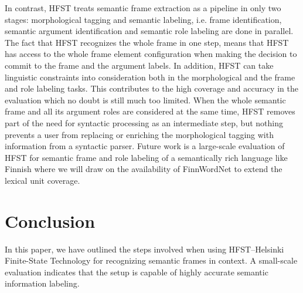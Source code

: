\documentclass{llncs}
\begin{document}



In contrast, HFST treats semantic frame extraction as a pipeline in only two stages: morphological tagging
and semantic labeling, i.e. frame identification, semantic argument identification and semantic role labeling are done in parallel.
The fact that HFST recognizes the whole frame in one step, means that HFST has access to the whole frame element configuration
when making the decision to commit to the frame and the argument labels. In addition, HFST can take linguistic constraints
into consideration both in the morphological and the frame and role labeling tasks. This contributes to the high coverage and accuracy
in the evaluation which no doubt is still much too limited. When the whole semantic frame and all its argument roles are considered
at the same time, HFST removes part of the need for syntactic processing as an intermediate step, but nothing prevents a user from
replacing or enriching the morphological tagging with information from a syntactic parser.
Future work is a large-scale evaluation of HFST for semantic frame and role labeling of a semantically rich language like Finnish
where we will draw on the availability of FinnWordNet \cite{Linden2010fiwn} to extend the lexical unit coverage.

\section{Conclusion}\label{sec:discussion}
In this paper, we have outlined the steps involved when using HFST--Helsinki Finite-State Technology
for recognizing semantic frames in context. A small-scale evaluation indicates that the setup is capable of
highly accurate semantic information labeling.



\end{document}

